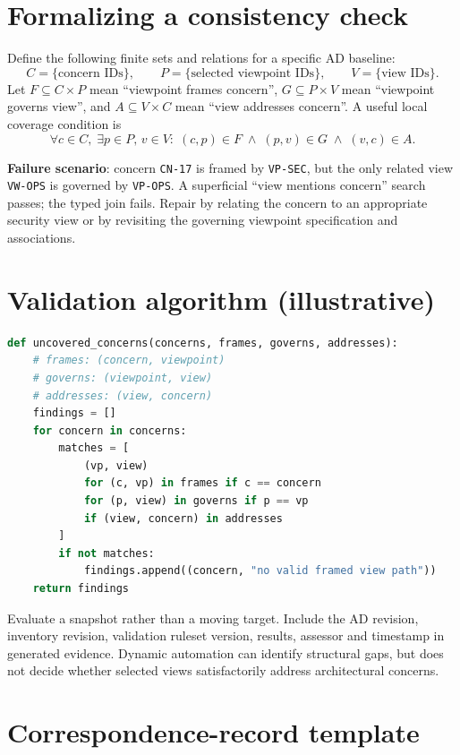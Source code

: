 \documentclass[11pt,letterpaper]{article}
\begin{document}
\section{Formalizing a consistency check}
Define the following finite sets and relations for a specific AD baseline:
\[C=\{\text{concern IDs}\},\qquad P=\{\text{selected viewpoint IDs}\},\qquad V=\{\text{view IDs}\}.\]
Let \(F\subseteq C\times P\) mean ``viewpoint frames concern'', \(G\subseteq P\times V\) mean ``viewpoint governs view'', and \(A\subseteq V\times C\) mean ``view addresses concern''. A useful local coverage condition is
\[\forall c\in C,\;\exists p\in P,\, v\in V:\; (c,p)\in F\;\land\;(p,v)\in G\;\land\;(v,c)\in A.\]
\begin{Worked}\textbf{Failure scenario}: concern \texttt{CN-17} is framed by \texttt{VP-SEC}, but the only related view \texttt{VW-OPS} is governed by \texttt{VP-OPS}. A superficial ``view mentions concern'' search passes; the typed join fails. Repair by relating the concern to an appropriate security view or by revisiting the governing viewpoint specification and associations.\end{Worked}
\section{Validation algorithm (illustrative)}
\begin{lstlisting}[language=Python,caption={Local check, not an algorithm prescribed by 42010}]
def uncovered_concerns(concerns, frames, governs, addresses):
    # frames: (concern, viewpoint)
    # governs: (viewpoint, view)
    # addresses: (view, concern)
    findings = []
    for concern in concerns:
        matches = [
            (vp, view)
            for (c, vp) in frames if c == concern
            for (p, view) in governs if p == vp
            if (view, concern) in addresses
        ]
        if not matches:
            findings.append((concern, "no valid framed view path"))
    return findings
\end{lstlisting}
\begin{Guidance}Evaluate a snapshot rather than a moving target. Include the AD revision, inventory revision, validation ruleset version, results, assessor and timestamp in generated evidence. Dynamic automation can identify structural gaps, but does not decide whether selected views satisfactorily address architectural concerns.\end{Guidance}
\section{Correspondence-record template}
\end{document}
